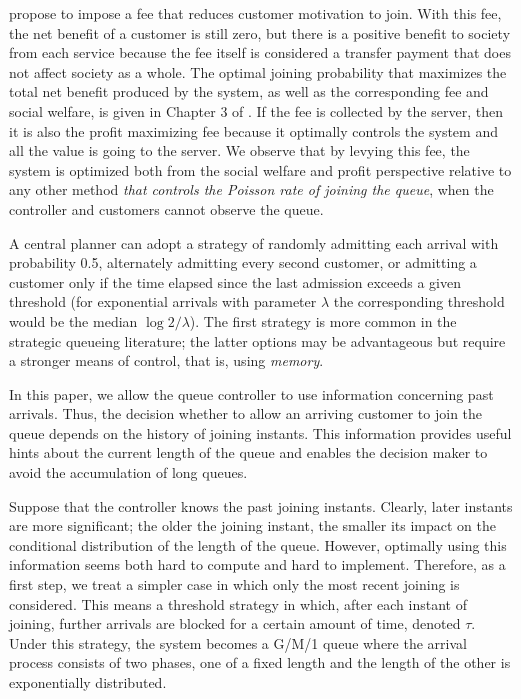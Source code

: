 \documentclass[11pt]{article}
\begin{document}
\citet{EH75} propose to impose a fee that reduces customer motivation to join. With this fee, the net benefit of a customer is still zero, but there is a positive benefit to society from each service because the fee itself is considered a transfer payment that does not affect society as a whole. The optimal joining probability that maximizes the total net benefit produced by the system, as well as the corresponding fee and social welfare, is given in Chapter 3 of \cite{HH03}.  If the fee is collected by the server, then it is also the profit maximizing fee because it optimally controls the system and all the value is going to the server.  We observe that by levying this fee, the system is optimized both from the social welfare and profit perspective relative to any other method {\it that controls the Poisson rate of joining the queue}, when the controller and customers cannot observe the queue.

A central planner can adopt a strategy of randomly admitting each
arrival with probability 0.5, alternately admitting every second customer, or admitting a customer only if the time elapsed since the last admission exceeds a given threshold (for exponential arrivals with parameter $\lambda$ the corresponding threshold would be the median $\log 2/\lambda$). The first strategy is more
common in the strategic queueing literature; the latter options may be advantageous but require a stronger means of control, that is, using {\it memory}.

In this paper, we allow the queue controller to use information concerning past arrivals.  Thus, the decision whether to allow an arriving customer to join the queue depends on the history of joining instants. This information provides useful hints about the current length of the queue and enables the decision maker to avoid the accumulation of long queues.   

Suppose that the controller knows the past joining instants.  Clearly, later instants are more significant; the older the joining instant, the smaller its impact on the conditional distribution of the length of the queue.  However, optimally using this information seems both hard to compute and hard to implement.  Therefore, as a first step, we treat a simpler case in which only the most recent joining is considered.  This means a threshold strategy in which, after each instant of joining, further arrivals are blocked for a certain amount of time, denoted $\tau$.  Under this strategy, the system becomes a G/M/1 queue where the arrival process consists of two phases, one of a fixed length and the length of the other is exponentially distributed. 
\end{document}
